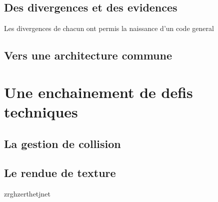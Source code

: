 \documentclass[french,12pt]{article}
\begin{document}
\subsection{Des divergences et des evidences}
Les divergences de chacun ont permis la naissance d'un code general

\subsection{Vers une architecture commune}

\section{Une enchainement de defis techniques}
\subsection{La gestion de collision}

\subsection{Le rendue de texture}

zrghzerthetjnet
\end{document}
